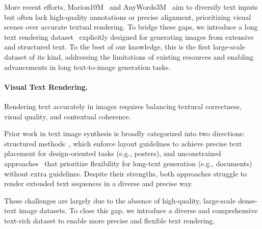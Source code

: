 More recent efforts, Marion10M~\cite{textdiffuser} and AnyWords3M~\cite{anytext} aim to diversify text inputs but often lack high-quality annotations or precise alignment, prioritizing visual scenes over accurate textual rendering.
To bridge these gaps, we introduce a long text rendering dataset \DatasetName~explicitly designed for generating images from extensive and structured text. 
To the best of our knowledge, this is the first large-scale dataset of its kind, addressing the limitations of existing resources and enabling advancements in long text-to-image generation tasks.




\paragraph{Visual Text Rendering.}

Rendering text accurately in images requires balancing textural correctness, visual quality, and contextual coherence. 

Prior work in text image synthesis is broadly categorized into two directions: structured methods~\cite{anytext,glyphcontrol,glyphdraw,textdiffuser,pixart,ca_aware}, which enforce layout guidelines to achieve precise text placement for design-oriented tasks (e.g., posters), and unconstrained approaches~\cite{dnd_transformer} that prioritize flexibility for long-text generation (e.g., documents) without extra guidelines.
Despite their strengths, both approaches struggle to render extended text sequences in a diverse and precise way.

These challenges are largely due to the absence of high-quality, large-scale dense-text image datasets. To close this gap, we introduce a diverse and comprehensive text-rich dataset to enable more precise and flexible text rendering.
